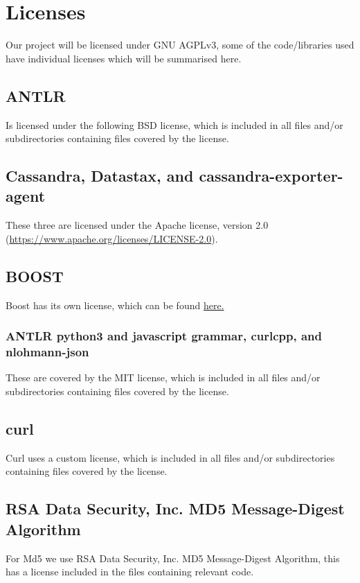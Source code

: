 \documentclass[./Main.tex]{subfiles}
\begin{document}
\section{Licenses}
Our project will be licensed under GNU AGPLv3, some of the code/libraries used have individual licenses which will be summarised here.

\tocless\subsection{ANTLR}
Is licensed under the following BSD license, which is included in all files and/or subdirectories containing files covered by the license.



\tocless\subsection{Cassandra, Datastax, and cassandra-exporter-agent}
These three are licensed under the Apache license, version 2.0 (\href{https://www.apache.org/licenses/LICENSE-2.0}{https://www.apache.org/licenses/LICENSE-2.0}).


\tocless\subsection{BOOST}
Boost has its own license, which can be found \href{https://www.boost.org/users/license.html}{here.}


\tocless\subsubsection{ANTLR python3 and javascript grammar, curlcpp, and nlohmann-json}
These are covered by the MIT license, which is included in all files and/or subdirectories containing files covered by the license.



\tocless\subsection{curl}
Curl uses a custom license, which is included in all files and/or subdirectories containing files covered by the license. 



\tocless\subsection{RSA Data Security, Inc. MD5 Message-Digest
Algorithm}
For Md5 we use RSA Data Security, Inc. MD5 Message-Digest Algorithm, this has a license included in the files containing relevant code.
\end{document}
